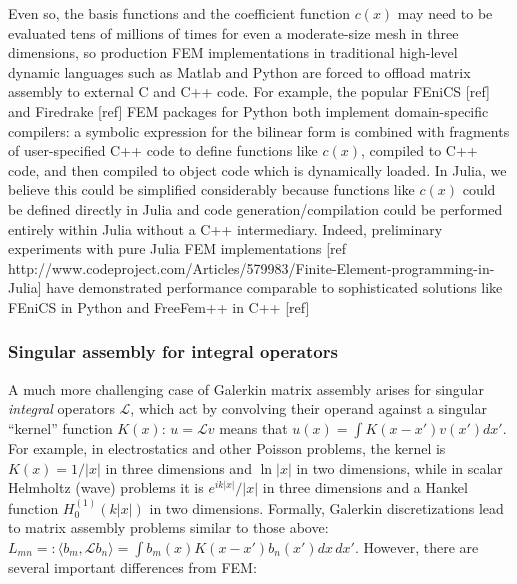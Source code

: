 Even so, the basis functions and the coefficient function $c(x)$ may need to be evaluated tens of millions of times for even a moderate-size mesh in three dimensions, so production FEM implementations in traditional high-level dynamic languages such as Matlab and Python are forced to offload matrix assembly to external C and C++ code.  For example, the popular FEniCS [ref] and Firedrake [ref] FEM packages for Python both implement domain-specific compilers: a symbolic expression for the bilinear form is combined with fragments of user-specified C++ code to define functions like $c(x)$, compiled to C++ code, and then compiled to object code which is dynamically loaded. In Julia, we believe this could be simplified considerably because functions like $c(x)$ could be defined directly in Julia and code generation/compilation could be performed entirely within Julia without a C++ intermediary.  Indeed, preliminary experiments with pure Julia FEM implementations [ref http://www.codeproject.com/Articles/579983/Finite-Element-programming-in-Julia] have demonstrated performance comparable to sophisticated solutions like FEniCS in Python and FreeFem++ in C++ [ref]

\subsubsection{Singular assembly for integral operators}

A much more challenging case of Galerkin matrix assembly arises for
singular \emph{integral} operators $\mathcal{L}$, which act by
convolving their operand against a singular ``kernel'' function
$K(x)$: $u = \mathcal{L} v$ means that $u(x) = \int K(x - x') v(x')
dx'$.  For example, in electrostatics and other Poisson problems, the
kernel is $K(x) = 1/|x|$ in three dimensions and $\ln |x|$ in two
dimensions, while in scalar Helmholtz (wave) problems it is
$e^{ik|x|}/|x|$ in three dimensions and a Hankel function
$H^{(1)}_0(k|x|)$ in two dimensions.  Formally, Galerkin
discretizations lead to matrix assembly problems similar to those
above: $L_{mn} =: \langle b_m, \mathcal{L} b_n \rangle = \int b_m(x)
K(x - x') b_n(x') dx\,dx'$.  However, there are several important
differences from FEM:

